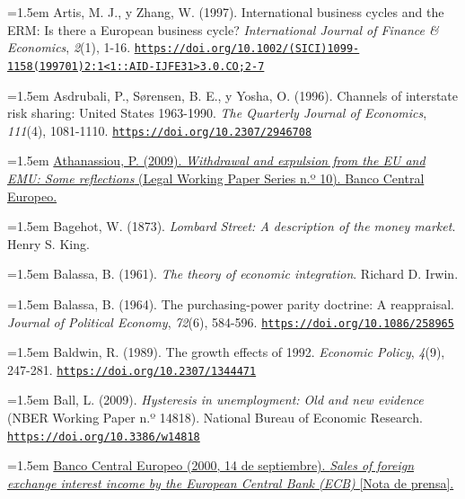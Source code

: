 \documentclass[10pt,a4paper]{article}
\begin{document}
\noindent\hangindent=1.5em Artis, M. J., y Zhang, W. (1997). International business cycles and the ERM: Is there a European business cycle? \textit{International Journal of Finance \& Economics}, \textit{2}(1), 1-16. \href{https://doi.org/10.1002/(SICI)1099-1158(199701)2:1\%3C1::AID-IJFE31\%3E3.0.CO;2-7}{\nolinkurl{https://doi.org/10.1002/(SICI)1099-1158(199701)2:1<1::AID-IJFE31>3.0.CO;2-7}}

\noindent\hangindent=1.5em Asdrubali, P., Sørensen, B. E., y Yosha, O. (1996). Channels of interstate risk sharing: United States 1963-1990. \textit{The Quarterly Journal of Economics}, \textit{111}(4), 1081-1110. \href{https://doi.org/10.2307/2946708}{\nolinkurl{https://doi.org/10.2307/2946708}}

\noindent\hangindent=1.5em \href{https://ideas.repec.org/p/ecb/ecblwp/200910.html}{Athanassiou, P. (2009). \textit{Withdrawal and expulsion from the EU and EMU: Some reflections} (Legal Working Paper Series n.º 10). Banco Central Europeo.}

\noindent\hangindent=1.5em Bagehot, W. (1873). \textit{Lombard Street: A description of the money market}. Henry S. King.

\noindent\hangindent=1.5em Balassa, B. (1961). \textit{The theory of economic integration}. Richard D. Irwin.

\noindent\hangindent=1.5em Balassa, B. (1964). The purchasing-power parity doctrine: A reappraisal. \textit{Journal of Political Economy}, \textit{72}(6), 584-596. \href{https://doi.org/10.1086/258965}{\nolinkurl{https://doi.org/10.1086/258965}}

\noindent\hangindent=1.5em Baldwin, R. (1989). The growth effects of 1992. \textit{Economic Policy}, \textit{4}(9), 247-281. \href{https://doi.org/10.2307/1344471}{\nolinkurl{https://doi.org/10.2307/1344471}}

\noindent\hangindent=1.5em Ball, L. (2009). \textit{Hysteresis in unemployment: Old and new evidence} (NBER Working Paper n.º 14818). National Bureau of Economic Research. \href{https://doi.org/10.3386/w14818}{\nolinkurl{https://doi.org/10.3386/w14818}}

\noindent\hangindent=1.5em \href{https://www.ecb.europa.eu/press/pr/date/2000/html/pr000914_1.en.html}{Banco Central Europeo (2000, 14 de septiembre). \textit{Sales of foreign exchange interest income by the European Central Bank (ECB)} [Nota de prensa].}
\end{document}

